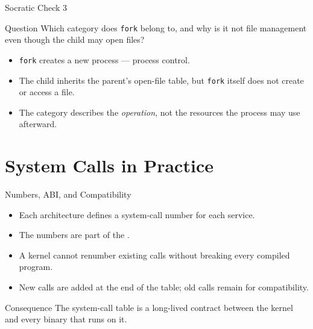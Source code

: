\documentclass[aspectratio=169]{beamer}
\begin{document}
\begin{frame}{Socratic Check 3}
  \begin{block}{Question}
    Which category does \texttt{fork} belong to, and why is it not file
    management even though the child may open files?
  \end{block}
  \vspace{0.25cm}
  \begin{itemize}
    \item \texttt{fork} creates a new process --- process control.
    \item The child inherits the parent's open-file table, but \texttt{fork}
      itself does not create or access a file.
    \item The category describes the \emph{operation}, not the resources the
      process may use afterward.
  \end{itemize}
\end{frame}

\section{System Calls in Practice}


\begin{frame}{Numbers, ABI, and Compatibility}
  \begin{itemize}
    \item Each architecture defines a system-call number for each service.
    \item The numbers are part of the .
    \item A kernel cannot renumber existing calls without breaking every
      compiled program.
    \item New calls are added at the end of the table; old calls remain for
      compatibility.
  \end{itemize}
  \vspace{0.2cm}
  \begin{block}{Consequence}
    The system-call table is a long-lived contract between the kernel and every
    binary that runs on it.
  \end{block}
\end{frame}
\end{document}
